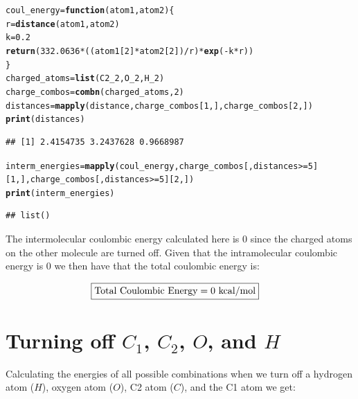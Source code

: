 \documentclass{article}\usepackage[]{graphicx}\usepackage[]{color}
\makeatletter
\newcommand{\hlnum}[1]{\textcolor[rgb]{0.686,0.059,0.569}{#1}}%
\newcommand{\hlopt}[1]{\textcolor[rgb]{0,0,0}{#1}}%
\newcommand{\hlstd}[1]{\textcolor[rgb]{0.345,0.345,0.345}{#1}}%
\newcommand{\hlkwa}[1]{\textcolor[rgb]{0.161,0.373,0.58}{\textbf{#1}}}%
\newcommand{\hlkwb}[1]{\textcolor[rgb]{0.69,0.353,0.396}{#1}}%
\newcommand{\hlkwc}[1]{\textcolor[rgb]{0.333,0.667,0.333}{#1}}%
\newcommand{\hlkwd}[1]{\textcolor[rgb]{0.737,0.353,0.396}{\textbf{#1}}}%
\newenvironment{kframe}{%
 \def\at@end@of@kframe{}%
 \ifinner\ifhmode%
  \def\at@end@of@kframe{\end{minipage}}%
  \begin{minipage}{\columnwidth}%
 \fi\fi%
 \def\FrameCommand##1{\hskip\@totalleftmargin \hskip-\fboxsep
 \colorbox{shadecolor}{##1}\hskip-\fboxsep
     \hskip-\linewidth \hskip-\@totalleftmargin \hskip\columnwidth}%
 \MakeFramed {\advance\hsize-\width
   \@totalleftmargin\z@ \linewidth\hsize
   \@setminipage}}%
 {\par\unskip\endMakeFramed%
 \at@end@of@kframe}
\newenvironment{knitrout}{}{} %
\makeatother
\begin{document}
\begin{knitrout}
\color{fgcolor}\begin{kframe}
\begin{alltt}
  \hlstd{coul_energy}\hlkwb{=}\hlkwa{function}\hlstd{(}\hlkwc{atom1}\hlstd{,}\hlkwc{atom2}\hlstd{)\{}
    \hlstd{r}\hlkwb{=}\hlkwd{distance}\hlstd{(atom1,atom2)}
    \hlstd{k}\hlkwb{=}\hlnum{0.2}
    \hlkwd{return}\hlstd{(}\hlnum{332.0636}\hlopt{*}\hlstd{((atom1[}\hlnum{2}\hlstd{]}\hlopt{*}\hlstd{atom2[}\hlnum{2}\hlstd{])}\hlopt{/}\hlstd{r)}\hlopt{*}\hlkwd{exp}\hlstd{(}\hlopt{-}\hlstd{k}\hlopt{*}\hlstd{r))}
  \hlstd{\}}
  \hlstd{charged_atoms} \hlkwb{=} \hlkwd{list}\hlstd{(C2_2,O_2,H_2)}
  \hlstd{charge_combos} \hlkwb{=} \hlkwd{combn}\hlstd{(charged_atoms,}\hlnum{2}\hlstd{)}
  \hlstd{distances}\hlkwb{=}\hlkwd{mapply}\hlstd{(distance,charge_combos[}\hlnum{1}\hlstd{,],charge_combos[}\hlnum{2}\hlstd{,])}
  \hlkwd{print}\hlstd{(distances)}
\end{alltt}
\begin{verbatim}
## [1] 2.4154735 3.2437628 0.9668987
\end{verbatim}
\begin{alltt}
  \hlstd{interm_energies} \hlkwb{=} \hlkwd{mapply}\hlstd{(coul_energy,charge_combos[,distances}\hlopt{>=}\hlnum{5}\hlstd{][}\hlnum{1}\hlstd{,],charge_combos[,distances}\hlopt{>=}\hlnum{5}\hlstd{][}\hlnum{2}\hlstd{,])}
  \hlkwd{print}\hlstd{(interm_energies)}
\end{alltt}
\begin{verbatim}
## list()
\end{verbatim}
\end{kframe}
\end{knitrout}

The intermolecular coulombic energy calculated here is $0$ since the charged atoms on the other molecule are turned off.  Given that the intramolecular coulombic energy is $0$ we then have that the total coulombic energy is:

\begin{align*}
  \Aboxed{\text{Total Coulombic Energy}=0\ \text{kcal/mol}}
\end{align*}

\section{Turning off $C_1$, $C_2$, $O$, and $H$}

Calculating the energies of all possible combinations when we turn off a hydrogen atom ($H$), oxygen atom ($O$), C2 atom ($C$), and the C1 atom we get:
\end{document}
